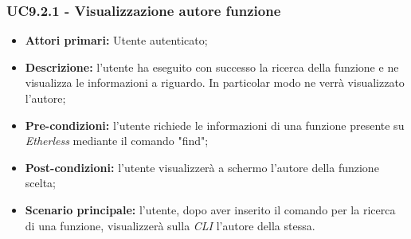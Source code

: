 \subsubsection{UC9.2.1 - Visualizzazione autore funzione}
\begin{itemize}
	\item \textbf{Attori primari:} Utente autenticato;
	\item \textbf{Descrizione:} l'utente ha eseguito con successo la ricerca della funzione e ne visualizza le informazioni a riguardo. In particolar modo ne verrà visualizzato l'autore; 
	\item \textbf{Pre-condizioni:} l'utente richiede le informazioni di una funzione presente su \textit{Etherless} mediante il comando "find"; 
	\item \textbf{Post-condizioni:} l'utente visualizzerà a schermo l'autore della funzione scelta;
	\item \textbf{Scenario principale:} l'utente, dopo aver inserito il comando per la ricerca di una funzione, visualizzerà sulla \textit{CLI\glo} l'autore della stessa.
\end{itemize}